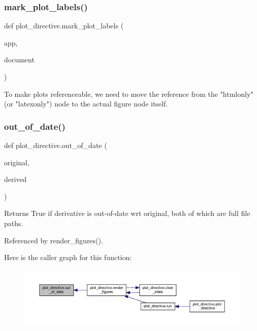 \subsubsection{\texorpdfstring{mark\+\_\+plot\+\_\+labels()}{mark\_plot\_labels()}}
{\footnotesize\ttfamily def plot\+\_\+directive.\+mark\+\_\+plot\+\_\+labels (\begin{DoxyParamCaption}\item[{}]{app,  }\item[{}]{document }\end{DoxyParamCaption})}

\begin{DoxyVerb}To make plots referenceable, we need to move the reference from
the "htmlonly" (or "latexonly") node to the actual figure node
itself.
\end{DoxyVerb}
 \mbox{\label{namespaceplot__directive_a91977c55a2c1fa1266cce25e1e724321}} 
\subsubsection{\texorpdfstring{out\+\_\+of\+\_\+date()}{out\_of\_date()}}
{\footnotesize\ttfamily def plot\+\_\+directive.\+out\+\_\+of\+\_\+date (\begin{DoxyParamCaption}\item[{}]{original,  }\item[{}]{derived }\end{DoxyParamCaption})}

\begin{DoxyVerb}Returns True if derivative is out-of-date wrt original,
both of which are full file paths.
\end{DoxyVerb}
 

Referenced by render\+\_\+figures().

Here is the caller graph for this function\+:
\nopagebreak
\begin{figure}[H]
\begin{center}
\leavevmode
\includegraphics[width=350pt]{namespaceplot__directive_a91977c55a2c1fa1266cce25e1e724321_icgraph}
\end{center}
\end{figure}
\mbox{\label{namespaceplot__directive_a81c752988ceef39206d1d2e4308baeea}} 
